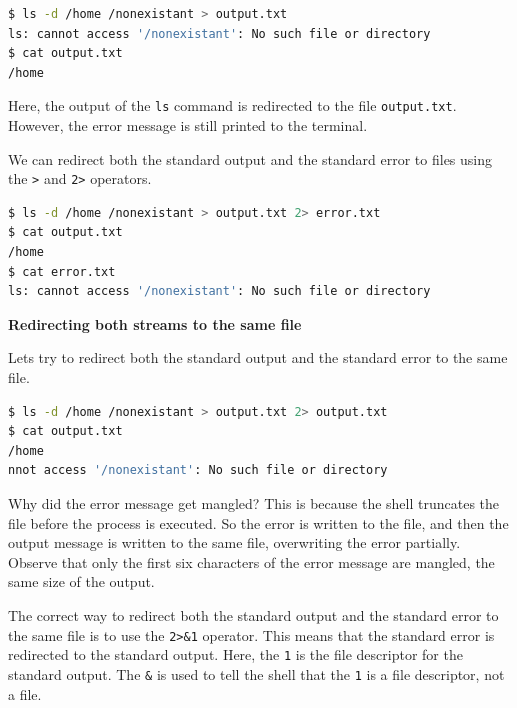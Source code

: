 \begin{lstlisting}[language=bash]
$ ls -d /home /nonexistant > output.txt
ls: cannot access '/nonexistant': No such file or directory
$ cat output.txt
/home
\end{lstlisting}

Here, the output of the \lstinline|ls| command is redirected to the file
\lstinline|output.txt|. However, the error message is still printed to
the terminal.

We can redirect both the standard output and the standard error to
files using the \lstinline|>| and \lstinline|2>| operators.

\begin{lstlisting}[language=bash]
$ ls -d /home /nonexistant > output.txt 2> error.txt
$ cat output.txt
/home
$ cat error.txt
ls: cannot access '/nonexistant': No such file or directory
\end{lstlisting}

\textbf{Redirecting both streams to the same file}

Lets try to redirect both the standard output and the standard error
to the same file.

\begin{lstlisting}[language=bash]
$ ls -d /home /nonexistant > output.txt 2> output.txt
$ cat output.txt
/home
nnot access '/nonexistant': No such file or directory
\end{lstlisting}

Why did the error message get mangled? This is because the shell
truncates the file before the process is executed. So the error
is written to the file, and then the output message is written to
the same file, overwriting the error partially.
Observe that only the first six characters of the
error message are mangled, the same size of the output.

The correct way to redirect both the standard output and the standard
error to the same file is to use the \lstinline|2>&1| operator.
This means that the standard error is redirected to the standard output.
Here, the \lstinline|1| is the file descriptor for the standard output.
The \lstinline|&| is used to tell the shell that the \lstinline|1| is a file
descriptor, not a file.

